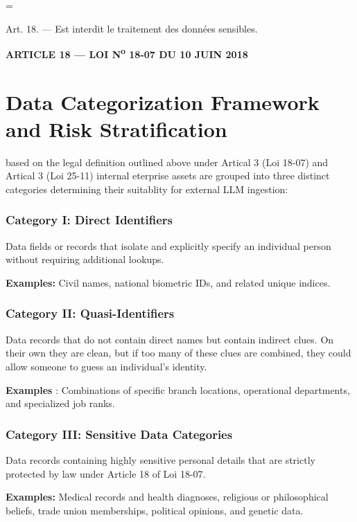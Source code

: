\documentclass[11pt,a4paper]{article}
\newenvironment{legalquote}{
    \begin{list}{}{
        \leftmargin=0.5in
        \rightmargin=0in
        \topsep=6pt
        \partopsep=0pt
        \parsep=\parskip
    }
    \item[]\itshape
}{
    \end{list}
}
\begin{document}
\begin{legalquote}
    Art. 18. — Est interdit le traitement des données sensibles.
\end{legalquote}
\hfill {\footnotesize\bfseries ARTICLE 18 — LOI N\textsuperscript{o} 18-07 DU 10 JUIN 2018}

\section{Data Categorization Framework and Risk Stratification}
based on the legal definition outlined above under Artical 3 (Loi 18-07) and Artical 3 (Loi 25-11) internal eterprise assets are grouped into three distinct categories determining their suitablity for external LLM ingestion:

\subsubsection{Category I: Direct Identifiers}
Data fields or records that isolate and explicitly specify an individual person without requiring additional lookups.

\hspace*{0.25in}\textbf{Examples:} Civil names, national biometric IDs, and related unique indices.

\subsubsection{Category II: Quasi-Identifiers}
Data records that do not contain direct names but contain indirect clues. On their own they are clean, but if too many of these clues are combined, they could allow someone to guess an individual's identity.

\hspace*{0.25in}\textbf{Examples} : Combinations of specific branch locations, operational departments, and specialized job ranks.

\subsubsection{Category III: Sensitive Data Categories}
Data records containing highly sensitive personal details that are strictly protected by law under Article 18 of Loi 18-07.

\hspace*{0.25in}\textbf{Examples:} Medical records and health diagnoses, religious or philosophical beliefs, trade union memberships, political opinions, and genetic data.
\newpage
\end{document}
